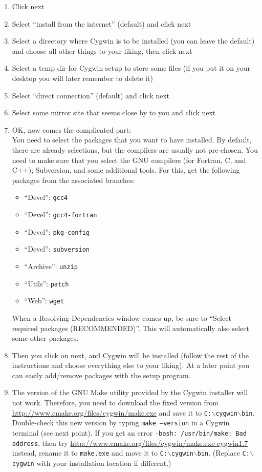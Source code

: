 \documentclass[10pt]{article}
\begin{document}
\begin{enumerate}
\item Click next
\item Select ``install from the internet'' (default) and click next
\item Select a directory where Cygwin is to be installed (you can
  leave the default) and choose all other things to your liking, then
  click next
\item Select a temp dir for Cygwin setup to store some files (if you
  put it on your desktop you will later remember to delete it)
\item Select ``direct connection'' (default) and click next
\item Select some mirror site that seems close by to you and click next
\item OK, now comes the complicated part:\\
  You need to select the packages that you want to have installed.  By
  default, there are already selections, but the compilers are usually
  not pre-chosen.  You need to make sure that you select the GNU
  compilers (for Fortran, C, and C++), Subversion, and some additional tools.
  For this, get the following packages from the associated branches:
  \begin{itemize}
  \item ``Devel'': {\tt gcc4}
  \item ``Devel'': {\tt gcc4-fortran}
  \item ``Devel'': {\tt pkg-config}
  \item ``Devel'': {\tt subversion}
  \item ``Archive'': {\tt unzip}
  \item ``Utils'': {\tt patch}
  \item ``Web'': {\tt wget}
  \end{itemize}
  When a Resolving Dependencies window comes up, be sure to
  ``Select required packages (RECOMMENDED)''.
  This will automatically also select some other packages.
  
\item\label{it:cyg_done} Then you click on next, and Cygwin will be
  installed (follow the rest of the instructions and choose everything
  else to your liking).  At a later point you can easily add/remove
  packages with the setup program.

\item The version of the GNU Make utility provided by the Cygwin installer 
   will not work. Therefore, you need to download the fixed version from 
  \url{http://www.cmake.org/files/cygwin/make.exe} and save it to {\tt C:$\backslash$cygwin$\backslash$bin}.
   Double-check this new version by typing {\tt make --version} in a Cygwin 
   terminal (see next point).
   If you get an error {\tt -bash: /usr/bin/make: Bad address}, then try 
   \url{http://www.cmake.org/files/cygwin/make.exe-cygwin1.7} instead, rename 
   it to {\tt make.exe} and move it to {\tt C:$\backslash$cygwin$\backslash$bin}.
   (Replace {\tt C:$\backslash$cygwin} with your installation location if different.)


\end{enumerate}
\end{document}
